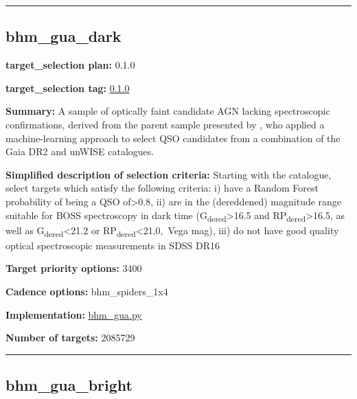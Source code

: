 \begin{center}\rule{0.5\linewidth}{0.5pt}\end{center}

\hypertarget{bhm_gua_dark_plan0.1.0}{%
\subsection{bhm\_gua\_dark}\label{bhm_gua_dark_plan0.1.0}}

\noindent\textbf{target\_selection plan:} 0.1.0

\noindent\textbf{target\_selection tag:}
\href{https://github.com/sdss/target_selection/tree/0.1.0/}{0.1.0}

\noindent\textbf{Summary:} A sample of optically faint candidate AGN lacking
spectroscopic confirmations, derived from the parent sample presented by
\citet{Shu2019}, who applied a machine-learning approach to select QSO
candidates from a combination of the Gaia DR2 and unWISE catalogues.

\noindent\textbf{Simplified description of selection criteria:} Starting with the
\citet{Shu2019} catalogue, select targets which satisfy the following
criteria: i) have a Random Forest probability of being a QSO
of\textgreater0.8, ii) are in the (dereddened) magnitude range suitable
for BOSS spectroscopy in dark time
(G\textsubscript{dered}\textgreater16.5 and
RP\textsubscript{dered}\textgreater16.5, as well as
G\textsubscript{dered}\textless21.2 or
RP\textsubscript{dered}\textless21.0,~Vega mag), iii) do not have good
quality optical spectroscopic measurements in SDSS DR16


\noindent\textbf{Target priority options:} 3400

\noindent\textbf{Cadence options:} bhm\_spiders\_1x4

\noindent\textbf{Implementation:}
\href{https://github.com/sdss/target_selection/blob/0.1.0/python/target_selection/cartons/bhm_gua.py}{bhm\_gua.py}

\noindent\textbf{Number of targets:} 2085729

\begin{center}\rule{0.5\linewidth}{0.5pt}\end{center}

\hypertarget{bhm_gua_bright_plan0.1.0}{%
\subsection{bhm\_gua\_bright}\label{bhm_gua_bright_plan0.1.0}}

